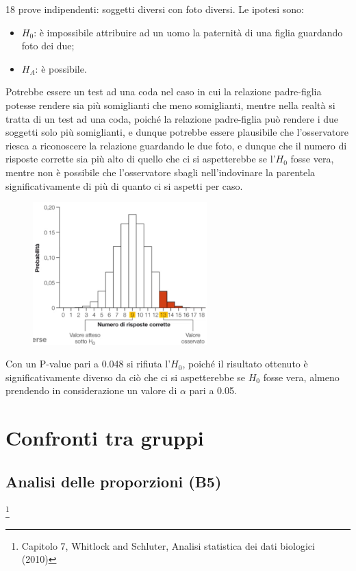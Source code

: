 \documentclass[10pt, draft]{book}
\newcounter{example}[section]
\begin{document}
\begin{example}
    18 prove indipendenti: soggetti diversi con foto diversi.
    Le ipotesi sono:
    \begin{itemize}
        \item $H_0$: è impossibile attribuire ad un uomo la paternità di una figlia guardando foto dei due;
        \item $H_A$: è possibile.
    \end{itemize}
    Potrebbe essere un test ad una coda nel caso in cui la relazione padre-figlia potesse rendere sia più somiglianti che meno somiglianti, mentre nella realtà si tratta di un test ad una coda, poiché la relazione padre-figlia può rendere i due soggetti solo più somiglianti, e dunque potrebbe essere plausibile che l’osservatore riesca a riconoscere la relazione guardando le due foto, e dunque che il numero di risposte corrette sia più alto di quello che ci si aspetterebbe se l’$H_0$ fosse vera, mentre non è possibile che l’osservatore sbagli nell’indovinare la parentela significativamente di più di quanto ci si aspetti per caso.
    \begin{figure}[H]\label{fig6.5-1}
    \centering
    \includegraphics[width=0.6\textwidth]{fig6.5-1}
    \caption{\small{}}
    \end{figure}
    Con un P-value pari a 0.048 si rifiuta l’$H_0$, poiché il risultato ottenuto è significativamente diverso da ciò che ci si aspetterebbe se $H_0$ fosse vera, almeno prendendo in considerazione un valore di $\alpha$ pari a 0.05.
\end{example}

\part{Confronti tra gruppi}


\chapter{Analisi delle proporzioni (B5)}\footnote{Capitolo 7, Whitlock and Schluter, Analisi statistica dei dati biologici (2010)}
\end{document}
